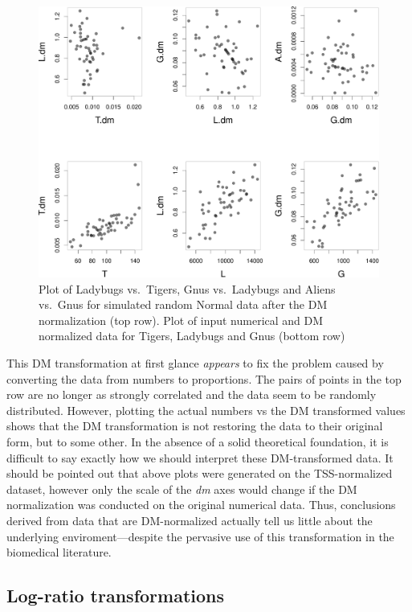 \documentclass[twocolumn]{article}
\begin{document}
\begin{figure}[htbp]
\centering
\includegraphics{main_files/figure-latex/R_block_DES-1.pdf}
\caption{\label{numbers} Plot of Ladybugs vs.~Tigers, Gnus vs.~Ladybugs
and Aliens vs.~Gnus for simulated random Normal data after the DM
normalization (top row). Plot of input numerical and DM normalized data
for Tigers, Ladybugs and Gnus (bottom row)}
\end{figure}

This DM transformation at first glance \emph{appears} to fix the problem
caused by converting the data from numbers to proportions. The pairs of
points in the top row are no longer as strongly correlated and the data
seem to be randomly distributed. However, plotting the actual numbers vs
the DM transformed values shows that the DM transformation is not
restoring the data to their original form, but to some other. In the
absence of a solid theoretical foundation, it is difficult to say
exactly how we should interpret these DM-transformed data. It should be
pointed out that above plots were generated on the TSS-normalized
dataset, however only the scale of the \emph{dm} axes would change if
the DM normalization was conducted on the original numerical data. Thus,
conclusions derived from data that are DM-normalized actually tell us
little about the underlying enviroment---despite the pervasive use of
this transformation in the biomedical literature.

\subsection{Log-ratio transformations}\label{log-ratio-transformations}
\end{document}
